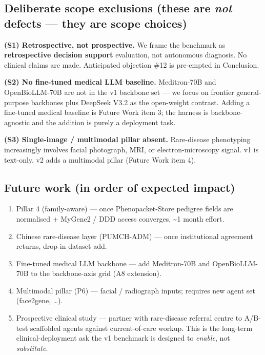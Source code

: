 \subsection{\texorpdfstring{Deliberate scope exclusions (these are \emph{not} defects --- they are scope choices)}{Deliberate scope exclusions (these are not defects --- they are scope choices)}}\label{sec-9-1}

\textbf{(S1) Retrospective, not prospective.} We frame the benchmark as
\textbf{retrospective decision support} evaluation, not autonomous
diagnosis. No clinical claims are made. Anticipated objection \#12 is pre-empted in  Conclusion.

\textbf{(S2) No fine-tuned medical LLM baseline.} Meditron-70B and
OpenBioLLM-70B are not in the v1 backbone set --- we focus on frontier
general-purpose backbones plus DeepSeek V3.2 as the open-weight
contrast. Adding a fine-tuned medical baseline is Future Work item 3;
the harness is backbone-agnostic and the addition is purely a
deployment task.

\textbf{(S3) Single-image / multimodal pillar absent.} Rare-disease
phenotyping increasingly involves facial photograph, MRI, or
electron-microscopy signal. v1 is text-only. v2 adds a multimodal
pillar (Future Work item 4).

\subsection{Future work (in order of expected impact)}\label{sec-9-2}

\begin{enumerate}
\def\labelenumi{\arabic{enumi}.}
\tightlist
\item
  Pillar 4 (family-aware) --- once Phenopacket-Store pedigree fields
  are normalised + MyGene2 / DDD access converges, \textasciitilde1 month effort.
\item
  Chinese rare-disease layer (PUMCH-ADM) --- once institutional
  agreement returns, drop-in dataset add.
\item
  Fine-tuned medical LLM backbone --- add Meditron-70B and
  OpenBioLLM-70B to the backbone-axis grid (A8 extension).
\item
  Multimodal pillar (P6) --- facial / radiograph inputs; requires
  new agent set (face2gene, \ldots).
\item
  Prospective clinical study --- partner with rare-disease referral
  centre to A/B-test scaffolded agents against current-of-care
  workup. This is the long-term clinical-deployment ask the v1
  benchmark is designed to \emph{enable}, not \emph{substitute}.
\end{enumerate}

